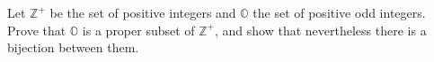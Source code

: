 Let $\mathbb Z^+$ be the set of positive integers and $\mathbb O$ the set of positive odd integers. Prove that $\mathbb O$ is a proper subset of $\mathbb Z^+$, and show that nevertheless there is a bijection between them.
